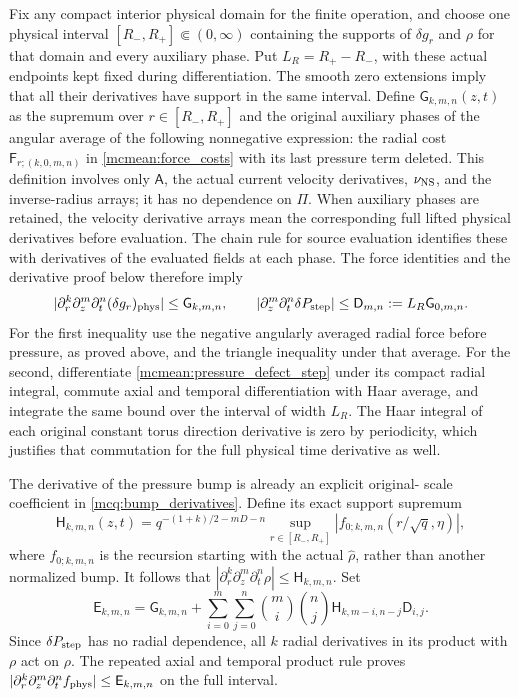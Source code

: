 Fix any compact interior physical domain for the finite operation,
and choose one physical interval \([R_-,R_+]\Subset(0,\infty)\)
containing the supports of \(\delta g_r\) and \(\rho\) for that
domain and every auxiliary phase. Put \(L_R=R_+-R_-\), with these
actual endpoints kept fixed during differentiation. The smooth zero
extensions imply that all their derivatives have support in the
same interval. Define \(\mathsf G_{k,m,n}(z,t)\) as the supremum
over \(r\in[R_-,R_+]\) and the original auxiliary phases of the
angular average of the following nonnegative expression: the radial
cost \(\mathsf F_{r;(k,0,m,n)}\) in \eqref{mcmean:force_costs}
with its last pressure term deleted. This definition involves only
\(\mathsf A\), the actual current velocity derivatives,
\(\nu_{\rm NS}\), and the inverse-radius arrays; it has no
dependence on \(\mathsf\Pi\). When auxiliary phases are retained,
the velocity derivative arrays mean the corresponding full lifted
physical derivatives before evaluation. The chain rule for source
evaluation identifies these with derivatives of the evaluated fields
at each phase. The force identities and the derivative proof below
therefore imply
\[
 |\partial_r^k\partial_z^m\partial_t^n(\delta g_r)_{\rm phys}|
       \le\mathsf G_{k,m,n},\qquad
 |\partial_z^m\partial_t^n\delta P_{\rm step}|
       \le\mathsf D_{m,n}:=L_R\mathsf G_{0,m,n}.
\]
For the first inequality use the negative angularly averaged radial
force before pressure, as proved above, and the triangle inequality
under that average. For the second, differentiate
\eqref{mcmean:pressure_defect_step} under its compact radial
integral, commute axial and temporal differentiation with Haar
average, and integrate the same bound over the interval of width
\(L_R\). The Haar integral of each original constant torus
direction derivative is zero by periodicity, which justifies that
commutation for the full physical time derivative as well.

The derivative of the pressure bump is already an explicit original-
scale coefficient in \eqref{mcq:bump_derivatives}. Define its exact
support supremum
\[
 \mathsf H_{k,m,n}(z,t)
 =q^{-(1+k)/2-mD-n}
    \sup_{r\in[R_-,R_+]}
       |f_{0;k,m,n}(r/\sqrt q,\eta)|,
\]
where \(f_{0;k,m,n}\) is the recursion starting with the actual
\(\widehat\rho\), rather than another normalized bump.
It follows that \(|\partial_r^k\partial_z^m\partial_t^n\rho|
\le\mathsf H_{k,m,n}\). Set
\begin{equation}\label{mcmean:pressure_source_cost}
 \mathsf E_{k,m,n}
 =\mathsf G_{k,m,n}
 +\sum_{i=0}^m\sum_{j=0}^n\binom mi\binom nj
        \mathsf H_{k,m-i,n-j}\mathsf D_{i,j}.
\end{equation}
Since \(\delta P_{\rm step}\) has no radial dependence, all
\(k\) radial derivatives in its product with \(\rho\) act on
\(\rho\). The repeated axial and temporal product rule proves
\(|\partial_r^k\partial_z^m\partial_t^n f_{\rm phys}|
\le\mathsf E_{k,m,n}\) on the full interval.

